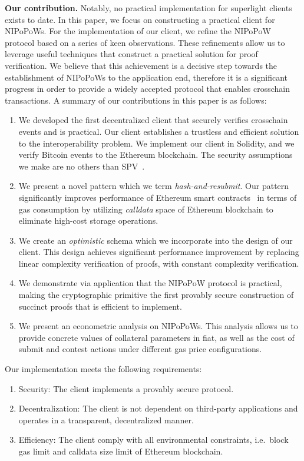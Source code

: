 \noindent

\textbf{Our contribution.} Notably, no practical implementation for superlight
clients exists to date. In this paper, we focus on constructing a practical
client for NIPoPoWs. For the implementation of our client, we refine the
NIPoPoW protocol based on a series of keen observations. These refinements
allow us to leverage useful techniques that construct a practical solution for
proof verification. We believe that this achievement is a decisive step towards
the establishment of NIPoPoWs to the application end, therefore it is a
significant progress in order to provide a widely accepted protocol that
enables crosschain transactions. A summary of our contributions in this paper
is as follows:
\begin{enumerate}
\item We developed the first decentralized client that securely verifies
crosschain events and is practical. Our client establishes a trustless and
efficient solution to the interoperability problem. We implement our client
in Solidity, and we verify Bitcoin events to the Ethereum blockchain. The
security assumptions we make are no others than
SPV~\cite{eclipse, eclipse-ethereum}.
\item We present a novel pattern which we term \emph{hash-and-resubmit}. Our
pattern significantly improves performance of Ethereum smart
contracts~\cite{wood, buterin} in terms of gas consumption by utilizing
\emph{calldata} space of Ethereum blockchain to eliminate high-cost storage
operations.
\item We create an \emph{optimistic} schema which we incorporate into the design
of our client. This design achieves significant performance improvement by
replacing linear complexity verification of proofs, with constant complexity
verification.
\item We demonstrate via application that the NIPoPoW protocol is practical,
making the cryptographic primitive the first provably secure construction of
succinct proofs that is efficient to implement.
\item We present an econometric analysis on NIPoPoWs. This analysis allows us
to provide concrete values of collateral parameters in fiat, as well as the
cost of submit and contest actions under different gas price configurations.

\end{enumerate}

Our implementation meets the following requirements:
\begin{enumerate}
\item Security: The client implements a provably secure protocol.
\item Decentralization: The client is not dependent on third-party applications
and operates in a transparent, decentralized manner.
\item Efficiency: The client comply with all environmental constraints, i.e.\
block gas limit and calldata size limit of Ethereum blockchain.
\end{enumerate}

